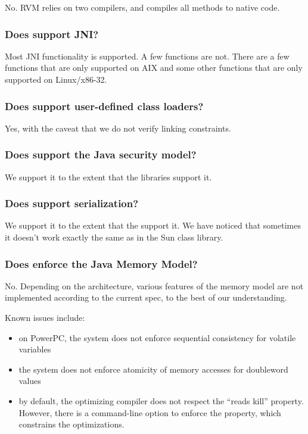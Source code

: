 No.  RVM relies on two compilers, and compiles all methods to native code.

\subsubsection{Does \jrvm{} support JNI?}

Most JNI functionality is supported. A few functions are not. 
There are a few functions that are only supported on AIX\TMweb{}
and some other functions that are only supported on Linux\Rweb{}/x86-32.

\subsubsection{Does \jrvm{} support user-defined class loaders?}
Yes, with the caveat that we do not verify linking constraints.

\subsubsection{Does \jrvm{} support the Java\TMheadingweb{} security model?} 

We support it to the extent that the 
libraries support it.

\subsubsection{Does \jrvm{} support serialization?}

We support it to the extent that the 
support it. We have noticed that sometimes it doesn't
work exactly the same as in the Sun\Rweb{} class library.

\subsubsection{Does \jrvm{} enforce the Java Memory Model?}

No. Depending on the architecture, various features of the memory model
are not implemented according to the current spec, to the best of our
understanding.

Known issues include:
\begin{itemize}
\item on PowerPC\TMweb{}, the system does not enforce
sequential consistency for volatile variables
\item the system does not enforce atomicity of memory accesses for
doubleword values
\item by default, the optimizing compiler does not respect the ``reads
kill'' property.  However, there is a command-line option to enforce the
property, which constrains the optimizations.
\end{itemize}

